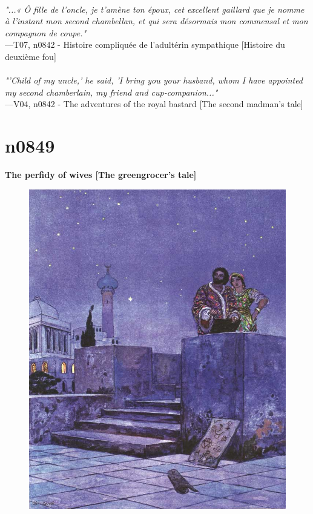 \documentclass[../Carre_nights.tex]{subfiles}
\begin{document}
\textit{\\
"...« Ô fille de l’oncle, je t’amène ton époux, cet excellent gaillard que je nomme à l’instant mon second chambellan, et qui sera désormais mon commensal et mon compagnon de coupe."} \\
—T07, n0842 - Histoire compliquée de l’adultérin sympathique [Histoire du deuxième fou] \\~\\
\textit{"'Child of my uncle,' he said, 'I bring you your husband, whom I have appointed my second chamberlain, my friend and cup-companion..."} \\
—V04, n0842 - The adventures of the royal bastard [The second madman’s tale]

\newpage

\section{n0849}
\textbf{\Large{The perfidy of wives [The greengrocer’s tale]}} \\

\begin{figure}[ht]
\centering
\includegraphics[height=\figsize]{illustrations/volume_7/T07, n0849 - La malice des épouses [Histoire racontée par le marchand de légumes].jpg}
\end{figure}
\end{document}
